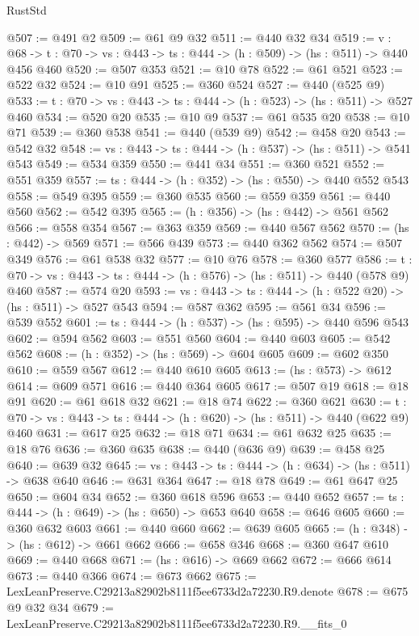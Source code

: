 \begin{lexlean}{RustStd}
\begin{coremodule}
@507 := @491 @2
@509 := @61 @9 @32
@511 := @440 @32 @34
@519 := {v : @68} ->
  {t : @70} -> {vs : @443} -> {ts : @444} -> (h : @509) -> (hs : @511) -> @440 @456 @460
@520 := @507 @353
@521 := @10 @78
@522 := @61 @521
@523 := @522 @32
@524 := @10 @91
@525 := @360 @524
@527 := @440 (@525 @9)
@533 := {t : @70} -> {vs : @443} -> {ts : @444} -> (h : @523) -> (hs : @511) -> @527 @460
@534 := @520 @20
@535 := @10 @9
@537 := @61 @535 @20
@538 := @10 @71
@539 := @360 @538
@541 := @440 (@539 @9)
@542 := @458 @20
@543 := @542 @32
@548 := {vs : @443} -> {ts : @444} -> (h : @537) -> (hs : @511) -> @541 @543
@549 := @534 @359
@550 := @441 @34
@551 := @360 @521
@552 := @551 @359
@557 := {ts : @444} -> (h : @352) -> (hs : @550) -> @440 @552 @543
@558 := @549 @395
@559 := @360 @535
@560 := @559 @359
@561 := @440 @560
@562 := @542 @395
@565 := (h : @356) -> (hs : @442) -> @561 @562
@566 := @558 @354
@567 := @363 @359
@569 := @440 @567 @562
@570 := (hs : @442) -> @569
@571 := @566 @439
@573 := @440 @362 @562
@574 := @507 @349
@576 := @61 @538 @32
@577 := @10 @76
@578 := @360 @577
@586 := {t : @70} -> {vs : @443} -> {ts : @444} -> (h : @576) -> (hs : @511) -> @440 (@578 @9) @460
@587 := @574 @20
@593 := {vs : @443} -> {ts : @444} -> (h : @522 @20) -> (hs : @511) -> @527 @543
@594 := @587 @362
@595 := @561 @34
@596 := @539 @552
@601 := {ts : @444} -> (h : @537) -> (hs : @595) -> @440 @596 @543
@602 := @594 @562
@603 := @551 @560
@604 := @440 @603
@605 := @542 @562
@608 := (h : @352) -> (hs : @569) -> @604 @605
@609 := @602 @350
@610 := @559 @567
@612 := @440 @610 @605
@613 := (hs : @573) -> @612
@614 := @609 @571
@616 := @440 @364 @605
@617 := @507 @19
@618 := @18 @91
@620 := @61 @618 @32
@621 := @18 @74
@622 := @360 @621
@630 := {t : @70} -> {vs : @443} -> {ts : @444} -> (h : @620) -> (hs : @511) -> @440 (@622 @9) @460
@631 := @617 @25
@632 := @18 @71
@634 := @61 @632 @25
@635 := @18 @76
@636 := @360 @635
@638 := @440 (@636 @9)
@639 := @458 @25
@640 := @639 @32
@645 := {vs : @443} -> {ts : @444} -> (h : @634) -> (hs : @511) -> @638 @640
@646 := @631 @364
@647 := @18 @78
@649 := @61 @647 @25
@650 := @604 @34
@652 := @360 @618 @596
@653 := @440 @652
@657 := {ts : @444} -> (h : @649) -> (hs : @650) -> @653 @640
@658 := @646 @605
@660 := @360 @632 @603
@661 := @440 @660
@662 := @639 @605
@665 := (h : @348) -> (hs : @612) -> @661 @662
@666 := @658 @346
@668 := @360 @647 @610
@669 := @440 @668
@671 := (hs : @616) -> @669 @662
@672 := @666 @614
@673 := @440 @366
@674 := @673 @662
@675 := LexLeanPreserve.C29213a82902b8111f5ee6733d2a72230.R9.denote
@678 := @675 @9 @32 @34
@679 := LexLeanPreserve.C29213a82902b8111f5ee6733d2a72230.R9.__fits_0

\end{coremodule}
\end{lexlean}

